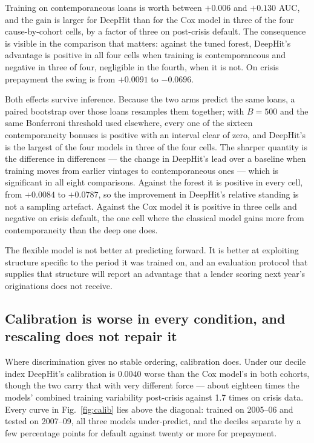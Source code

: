 \documentclass[11pt,journal]{IEEEtran}
\begin{document}
Training on contemporaneous loans is worth between $+0.006$ and $+0.130$ AUC,
and the gain is larger for DeepHit than for the Cox model in three of the four
cause-by-cohort cells, by a factor of three on post-crisis default. The
consequence is visible in the comparison that matters: against the tuned forest,
DeepHit's advantage is positive in all four cells when training is
contemporaneous and negative in three of four, negligible in the fourth, when it
is not. On crisis prepayment the swing is from $+0.0091$ to $-0.0696$.

Both effects survive inference. Because the two arms predict the same loans, a
paired bootstrap over those loans resamples them together; with $B=500$ and the
same Bonferroni threshold used elsewhere, every one of the sixteen
contemporaneity bonuses is positive with an interval clear of zero, and
DeepHit's is the largest of the four models in three of the four cells. The
sharper quantity is the difference in differences --- the change in DeepHit's
lead over a baseline when training moves from earlier vintages to contemporaneous
ones --- which is significant in all eight comparisons. Against the forest it is
positive in every cell, from $+0.0084$ to $+0.0787$, so the improvement in
DeepHit's relative standing is not a sampling artefact. Against the Cox model it
is positive in three cells and negative on crisis default, the one cell where
the classical model gains more from contemporaneity than the deep one does.

The flexible model is not better at predicting forward. It is better at
exploiting structure specific to the period it was trained on, and an evaluation
protocol that supplies that structure will report an advantage that a lender
scoring next year's originations does not receive.



\subsection{Calibration is worse in every condition, and rescaling does not repair it}
\label{sec:calib}
Where discrimination gives no stable ordering, calibration does. Under our
decile index DeepHit's calibration is $0.0040$ worse than the Cox model's in
both cohorts, though the two carry that with very different force --- about
eighteen times the models' combined training variability post-crisis against
1.7 times on crisis data. Every curve in Fig.~\ref{fig:calib} lies above the
diagonal: trained on 2005--06 and tested on 2007--09, all three models
under-predict, and the deciles separate by a few percentage points for default
against twenty or more for prepayment.
\end{document}
